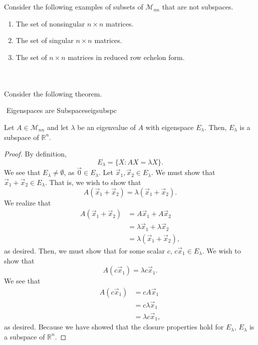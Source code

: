         \vphantom
        \\
        \\
        Consider the following examples of subsets of \(\mathcal{M}_{nn}\) that are not subspaces.
        \begin{enumerate}
            \item The set of nonsingular \(n\times n\) matrices.
            \item The set of singular \(n\times n\) matrices.
            \item The set of \(n\times n\) matrices in reduced row echelon form.
        \end{enumerate}
        \pagebreak
        \vphantom
        \\
        \\
        Consider the following theorem.
        \begin{theorem}{\Stop\,\,Eigenspaces are Subspaces}{eigsubspc}

            Let \(A\in\mathcal{M}_{nn}\) and let \(\lambda\) be an eigenvalue of \(A\) with eigenspace \(E_\lambda\). Then, \(E_\lambda\) is a subspace of \(\mathbb{R}^n\).
            \begin{proof}
                By definition,
                \begin{equation*}
                    E_\lambda=\{X:AX=\lambda X\}.
                \end{equation*}
                We see that \(E_\lambda\neq\emptyset\), as \(\vec{0}\in E_\lambda\). Let \(\vec{x}_1,\vec{x}_2\in E_\lambda\). We must show that \(\vec{x}_1+\vec{x}_2\in E_\lambda\). That is, we wish to show that
                \begin{equation*}
                    A(\vec{x}_1+\vec{x}_2)=\lambda(\vec{x}_1+\vec{x}_2).
                \end{equation*}
                We realize that
                \begin{align*}
                    A(\vec{x}_1+\vec{x}_2)&=A\vec{x}_1+A\vec{x}_2 \\
                    &=\lambda\vec{x}_1+\lambda\vec{x}_2 \\
                    &=\lambda(\vec{x}_1+\vec{x}_2),
                \end{align*}
                as desired. Then, we must show that for some scalar \(c\), \(c\vec{x}_1\in E_\lambda\). We wish to show that 
                \begin{equation*}
                    A(c\vec{x}_1)=\lambda c\vec{x}_1.    
                \end{equation*}
                We see that
                \begin{align*}
                    A(c\vec{x}_1)&=cA\vec{x}_1 \\
                    &=c\lambda\vec{x}_1 \\
                    &=\lambda c\vec{x}_1,
                \end{align*}
                as desired. Because we have showed that the closure properties hold for \(E_\lambda\), \(E_\lambda\) is a subspace of \(\mathbb{R}^n\).
            \end{proof}

        \end{theorem}

